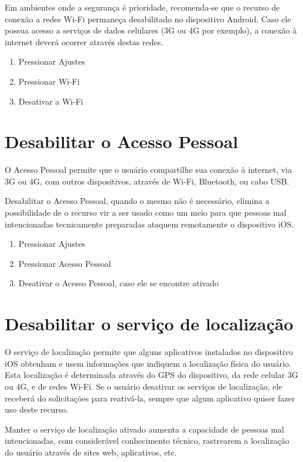 Em ambientes onde a seguran\c ca \'e prioridade, recomenda-se que o recurso de conex\~ao a redes Wi-Fi permane\c ca desabilitado no dispositivo Android. Caso ele possua acesso a servi\c cos de dados celulares (3G ou 4G por exemplo), a conex\~ao \`a internet dever\'a ocorrer atrav\'es destas redes.

\begin{enumerate}
\item Pressionar Ajustes
\item Pressionar Wi-Fi
\item Desativar a Wi-Fi
\end{enumerate}

\section{Desabilitar o Acesso Pessoal}

O Acesso Pessoal permite que o usu\'ario compartilhe sua conex\~ao \`a internet, via 3G ou 4G, com outros dispositivos, atrav\'es de Wi-Fi, Bluetooth, ou cabo USB. 

Desabilitar o Acesso Pessoal, quando o mesmo n\~ao \'e necess\'ario, elimina a possibilidade de o recurso vir a ser usado como um meio para que pessoas mal intencionadas tecnicamente preparadas ataquem remotamente o dispositivo iOS.

\begin{enumerate}
\item Pressionar Ajustes
\item Pressionar Acesso Pessoal
\item Desativar o Acesso Pessoal, caso ele se encontre ativado
\end{enumerate}

\section{Desabilitar o servi\c co de localiza\c c\~ao}

O servi\c co de localiza\c c\~ao permite que alguns aplicativos instalados no dispositivo iOS obtenham e usem informa\c c\~oes que indiquem a localiza\c c\~ao f\'isica do usu\'ario. Esta localiza\c c\~ao \'e determinada atrav\'es do GPS do dispositivo, da rede celular 3G ou 4G, e de redes Wi-Fi. 
Se o usu\'ario desativar os servi\c cos de localiza\c c\~ao, ele receber\'a do solicita\c c\~oes para reativ\'a-la, sempre que algum aplicativo quiser fazer uso deste recurso.

Manter o servi\c co de localiza\c c\~ao ativado aumenta a capacidade de pessoas mal intencionadas, com consider\'avel conhecimento t\'ecnico, rastrearem a localiza\c c\~ao do usu\'ario atrav\'es de sites web, aplicativos, etc.

